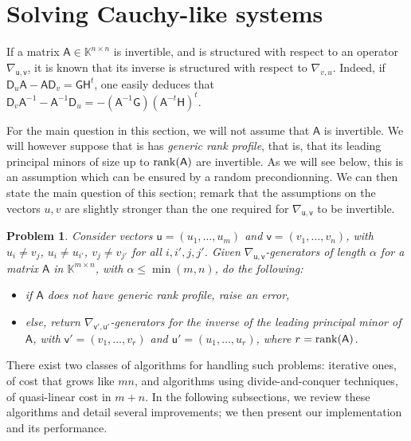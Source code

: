\documentclass{sig-alternate}
\newcommand{\vu}{\ensuremath{\mathsf{u}}}
\newcommand{\vv}{\ensuremath{\mathsf{v}}}
\newcommand{\mA}{\ensuremath{\mathsf{A}}}
\newcommand{\mD}{\ensuremath{\mathsf{D}}}
\newcommand{\mG}{\ensuremath{\mathsf{G}}}
\newcommand{\mH}{\ensuremath{\mathsf{H}}}
\newcommand{\K}{\ensuremath{\mathbb{K}}}
\newtheorem{pbm}{Problem}
\begin{document}

\section{Solving Cauchy-like systems}

If a matrix $\mA \in \K^{n\times n}$ is invertible, and is structured
with respect to an operator $\nabla_{\vu,\vv}$, it is known that its inverse is
structured with respect to $\nabla_{v,u}$. Indeed, if $\mD_u \mA -
\mA \mD_v = \mG \mH^t$, one easily deduces that $\mD_v \mA^{-1} -
\mA^{-1} \mD_u = - (\mA^{-1} \mG)  (\mA^{-t} \mH)^t$.

For the main question in this section, we will not assume that $\mA$
is invertible. We will however suppose that is has {\em generic rank
profile}, that is, that its leading principal minors of size up to
${\rm rank}(\mA)$ are invertible. As we will see below, this is an
assumption which can be ensured by a random precondionning. 
We can then state the main question of this section; remark that the 
assumptions on the vectors $u,v$ are slightly stronger than the one 
required for $\nabla_{\vu,\vv}$ to be invertible.
\begin{pbm}\label{pb:cauchy}
  Consider vectors $\vu=(u_1,\dots,u_m)$ and $\vv=(v_1,\dots,v_n)$, with
  $u_i \ne v_j$, $u_i \ne u_{i'}$, $v_j \ne v_{j'}$ for all
  $i,i',j,j'$.  Given $\nabla_{\vu,\vv}$-generators of length $\alpha$ for
  a matrix $\mA$ in $\K^{m \times n}$, with $\alpha \le \min(m,n)$, do
  the following:
  \begin{itemize}
  \item if $\mA$ does not have generic rank profile, raise an error,
  \item else, return $\nabla_{\vv',\vu'}$-generators for the inverse of the
    leading principal minor of $\mA$, with $\vv'=(v_1,\dots,v_r)$ and
    $\vu'=(u_1,\dots,u_r)$, where $r={\rm rank}(\mA)$.
\end{itemize}
\end{pbm}
There exist two classes of algorithms for handling such problems:
iterative ones, of cost that grows like $mn$, and algorithms using
divide-and-conquer techniques, of quasi-linear cost in $m+n$. In the
following subsections, we review these algorithms and detail several
improvements; we then present our implementation and its performance.
\end{document}
